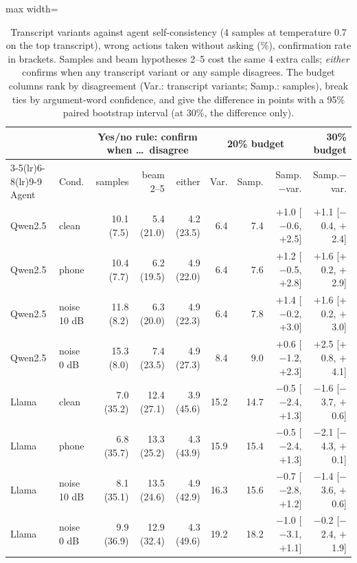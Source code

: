 \begin{table}[t]\centering\small
\setlength{\tabcolsep}{4pt}\begin{adjustbox}{max width=\linewidth}\begin{tabular}{llrrrrrrr}\toprule
 & & \multicolumn{3}{c}{Yes/no rule: confirm when \dots\ disagree} & \multicolumn{3}{c}{20\% budget} & 30\% budget \\ \cmidrule(lr){3-5}\cmidrule(lr){6-8}\cmidrule(lr){9-9}
Agent & Cond. & samples & beam 2--5 & either & Var. & Samp. & Samp.$-$var. & Samp.$-$var. \\ \midrule
Qwen2.5 & clean & 10.1 {\scriptsize (7.5)} & 5.4 {\scriptsize (21.0)} & 4.2 {\scriptsize (23.5)} & 6.4 & 7.4 & $+$1.0 {\scriptsize [$-$0.6, $+$2.5]} & $+$1.1 {\scriptsize [$-$0.4, $+$2.4]} \\
Qwen2.5 & phone & 10.4 {\scriptsize (7.7)} & 6.2 {\scriptsize (19.5)} & 4.9 {\scriptsize (22.0)} & 6.4 & 7.6 & $+$1.2 {\scriptsize [$-$0.5, $+$2.8]} & $+$1.6 {\scriptsize [$+$0.2, $+$2.9]} \\
Qwen2.5 & noise 10 dB & 11.8 {\scriptsize (8.2)} & 6.3 {\scriptsize (20.0)} & 4.9 {\scriptsize (22.3)} & 6.4 & 7.8 & $+$1.4 {\scriptsize [$-$0.2, $+$3.0]} & $+$1.6 {\scriptsize [$+$0.2, $+$3.0]} \\
Qwen2.5 & noise 0 dB & 15.3 {\scriptsize (8.0)} & 7.4 {\scriptsize (23.5)} & 4.9 {\scriptsize (27.3)} & 8.4 & 9.0 & $+$0.6 {\scriptsize [$-$1.2, $+$2.3]} & $+$2.5 {\scriptsize [$+$0.8, $+$4.1]} \\
\midrule
Llama & clean & 7.0 {\scriptsize (35.2)} & 12.4 {\scriptsize (27.1)} & 3.9 {\scriptsize (45.6)} & 15.2 & 14.7 & $-$0.5 {\scriptsize [$-$2.4, $+$1.3]} & $-$1.6 {\scriptsize [$-$3.7, $+$0.6]} \\
Llama & phone & 6.8 {\scriptsize (35.7)} & 13.3 {\scriptsize (25.2)} & 4.3 {\scriptsize (43.9)} & 15.9 & 15.4 & $-$0.5 {\scriptsize [$-$2.4, $+$1.3]} & $-$2.1 {\scriptsize [$-$4.3, $+$0.1]} \\
Llama & noise 10 dB & 8.1 {\scriptsize (35.1)} & 13.5 {\scriptsize (24.6)} & 4.9 {\scriptsize (42.9)} & 16.3 & 15.6 & $-$0.7 {\scriptsize [$-$2.8, $+$1.2]} & $-$1.4 {\scriptsize [$-$3.6, $+$0.6]} \\
Llama & noise 0 dB & 9.9 {\scriptsize (36.9)} & 12.9 {\scriptsize (32.4)} & 4.3 {\scriptsize (49.6)} & 19.2 & 18.2 & $-$1.0 {\scriptsize [$-$3.1, $+$1.1]} & $-$0.2 {\scriptsize [$-$2.4, $+$1.9]} \\
\bottomrule\end{tabular}\end{adjustbox}
\caption{Transcript variants against agent self-consistency (4 samples at temperature 0.7 on the top transcript), wrong actions taken without asking (\%), confirmation rate in brackets. Samples and beam hypotheses 2--5 cost the same 4 extra calls; \emph{either} confirms when any transcript variant or any sample disagrees. The budget columns rank by disagreement (Var.: transcript variants; Samp.: samples), break ties by argument-word confidence, and give the difference in points with a 95\% paired bootstrap interval (at 30\%, the difference only).}\label{tab:sc}
\end{table}

